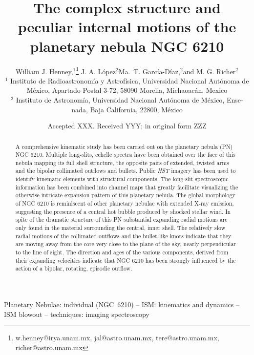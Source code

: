 \documentclass[useAMS, usenatbib]{mnras}
\title{The complex structure and peculiar internal motions of the planetary nebula NGC 6210}
\author[López et al.]{
  William J. Henney,\(^1\)\thanks{
    w.henney@irya.unam.mx,
    jal@astro.unam.mx,
    tere@astro.unam.mx,
    richer@astro.unam.mx
  }
  J. A. López\(^2\)\footnotemark[1]
  Ma.\ T. García-Díaz,\(^2\)\footnotemark[1]
  and M. G. Richer\(^2\)\footnotemark[1]
  \\
  \(^1\)\foreignlanguage{spanish}{
    Instituto de Radioastronomía y
    Astrofísica, Universidad Nacional Autónoma de México, Apartado
    Postal 3-72, 58090 Morelia, Michaoacán, Mexico}
  \\
  \(^2\)\foreignlanguage{spanish}{
    Instituto de Astronomía,
    Universidad Nacional Autónoma de México,
    Ensenada, Baja California, 22800, México}
}
\date{Accepted XXX. Received YYY; in original form ZZZ}
\begin{document}
 
\label{firstpage}
\pagerange{\pageref{firstpage}--\pageref{lastpage}}
\maketitle

\begin{abstract}
  A comprehensive kinematic study has been carried out on the planetary nebula (PN) NGC 6210. Multiple long-slits, echelle spectra have been obtained over the face of this nebula mapping its full shell structure, the opposite pairs of extended, twisted arms and the bipolar collimated outflows and bullets. Public {\it HST} imagery has been used to identify kinematic elements with structural components. The long-slit spectroscopic information has been combined into channel maps that greatly facilitate visualizing the otherwise intricate expansion pattern of this  planetary nebula. The global morphology of NGC 6210 is  reminiscent of other planetary nebulae with extended X-ray emission, suggesting the presence of a central hot bubble produced by shocked stellar wind. In spite of the dramatic structure of this PN substantial expanding radial motions are only found in the material surrounding the central, inner shell. The relatively slow radial motions of the collimated outflows and the bullet-like knots indicate that they are  moving away from the core very close to the plane of the sky, nearly perpendicular to the line of sight. The direction and ages of the various components, derived from their expanding velocities indicate that NGC 6210 has been strongly influenced by the  action of a bipolar, rotating, episodic outflow.
\end{abstract}


\begin{keywords}
  Planetary Nebulae: individual (NGC~6210)
  -- ISM: kinematics and dynamics -- ISM blowout
  -- techniques: imaging spectroscopy
\end{keywords}

\maketitle
\end{document}
